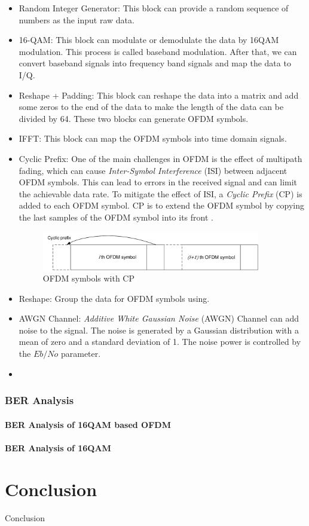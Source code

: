 \documentclass{article}
\numberwithin{figure}{section}
\numberwithin{equation}{section}
\begin{document}
\begin{itemize}
    \item Random Integer Generator: This block can provide a random sequence of numbers as the input raw data.
    \item 16-QAM: This block can modulate or demodulate the data by 16QAM modulation. This process is called baseband modulation. After that, we can convert baseband signals into frequency band signals and map the data to I/Q.
    \item Reshape + Padding: This block can reshape the data into a matrix and add some zeros to the end of the data to make the length of the data can be divided by 64. These two blocks can generate OFDM symbols.
    \item IFFT: This block can map the OFDM symbols into time domain signals. 
    \item Cyclic Prefix: One of the main challenges in OFDM is the effect of multipath fading, which can cause \textit{Inter-Symbol Interference} (ISI) between adjacent OFDM symbols. This can lead to errors in the received signal and can limit the achievable data rate. To mitigate the effect of ISI, a \textit{Cyclic Prefix} (CP) is added to each OFDM symbol. CP is to extend the OFDM symbol by copying the last samples of the OFDM symbol into its front \cite{RN146}.
    \begin{figure}[!ht]
        \centering
        \includegraphics[width=0.9\textwidth]{images/Cyclic prefix.pdf}
        \caption{OFDM symbols with CP}
        \label{fig:CP}
    \end{figure}
    \item Reshape: Group the data for OFDM symbols using.
    \item AWGN Channel: \textit{Additive White Gaussian Noise} (AWGN) Channel can add noise to the signal. The noise is generated by a Gaussian distribution with a mean of zero and a standard deviation of 1. The noise power is controlled by the $Eb/No$ parameter.
    \item 
\end{itemize}

\section{BER Analysis}

\subsection{BER Analysis of 16QAM based OFDM}

\subsection{BER Analysis of 16QAM}

\part{Conclusion}
Conclusion




\end{document}
